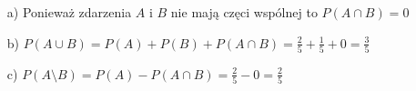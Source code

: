 \medskip
{} 
\medskip

\begin{itemize}
\item[a)] Ponieważ zdarzenia $A$ i $B$ nie mają częci wspólnej to $P(A \cap B) = 0$
\item[b)]$ P(A \cup B) = P(A) + P(B) + P(A \cap B) = \frac{2}{5} + \frac{1}{5} + 0 = \frac{3}{5}$
\item[c)] $P(A \setminus B) = P(A) - P(A \cap B) = \frac{2}{5} - 0 = \frac{2}{5}$
\end{itemize}
